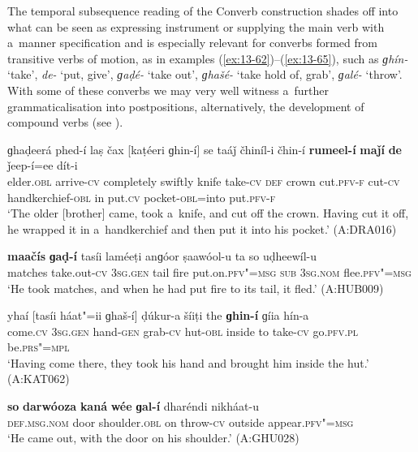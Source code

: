 The temporal subsequence reading of the Converb construction shades off into what can be seen as expressing instrument or supplying the main verb with a~manner specification and is especially relevant for converbs formed from transitive verbs of motion, as in examples (\ref{ex:13-62})--(\ref{ex:13-65}), such as \textit{ɡhín-} `take', \textit{de-} `put, give', \textit{ɡaḍé-} `take out', \textit{ɡhašé-} `take hold of, grab', \textit{ɡalé-} `throw'. With some of these converbs we may very well witness a~further grammaticalisation into postpositions, alternatively, the development of compound verbs (see ). 

\begin{exe}
\ex
\label{ex:13-62}
\gll ɡhaḍeerá phed-í laṣ čax [kaṭéeri ɡhin-í] se taáǰ čhiníl-i čhin-í \textbf{rumeel-í} \textbf{maǰí} \textbf{de} ǰeep-í=ee dít-i \\
elder.\textsc{obl} arrive-\textsc{cv} completely swiftly knife take-\textsc{cv} \textsc{def} crown cut.\textsc{pfv-f} cut-\textsc{cv} handkerchief-\textsc{obl} in put.\textsc{cv} pocket-\textsc{obl}=into put.\textsc{pfv-f} \\
\glt `The older [brother] came, took a~knife, and cut off the crown. Having cut it off, he wrapped it in a~handkerchief and then put it into his pocket.' (A:DRA016)

\ex
\label{ex:13-63}
\gll \textbf{maačís} \textbf{ɡaḍ-í} tasíi laméeṭi anɡóor ṣaawóol-u ta so uḍheewíl-u \\
matches take.out-\textsc{cv} \textsc{3sg.gen} tail fire put.on.\textsc{pfv"=msg}  \textsc{sub } \textsc{3sg.nom} flee.\textsc{pfv"=msg} \\
\glt `He took matches, and when he had put fire to its tail, it fled.' (A:HUB009)

\ex
\label{ex:13-64}
\gll yhaí [tasíi háat"=ii ɡhaš-í] ḍúkur-a šíiṭi the \textbf{ɡhin-í} ɡíia hín-a  \\
come.\textsc{cv} \textsc{3sg.gen} hand-\textsc{gen} grab-\textsc{cv} hut-\textsc{obl} inside to  take-\textsc{cv} go.\textsc{pfv.pl} be.\textsc{prs"=mpl} \\
\glt `Having come there, they took his hand and brought him inside the hut.' (A:KAT062)

\ex
\label{ex:13-65}
\gll \textbf{so} \textbf{darwóoza} \textbf{kaná} \textbf{wée} \textbf{ɡal-í} dharéndi nikháat-u\\
\textsc{def.msg.nom} door shoulder.\textsc{obl} on throw-\textsc{cv} outside appear.\textsc{pfv"=msg}\\
\glt `He came out, with the door on his shoulder.' (A:GHU028) 
\end{exe}

